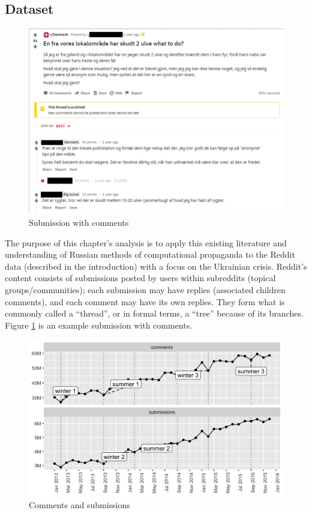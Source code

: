 \subsection{Dataset}

\begin{figure}[!ht]
\centering
\includegraphics[width=\textwidth]{reddit}
\caption{Submission with comments \cite{reddit}}
\label{fig:reddit}
\end{figure}

The purpose of this chapter's analysis is to apply this existing literature and understanding of Russian methods of computational propaganda to the Reddit data (described in the introduction) with a focus on the Ukrainian crisis.
Reddit's content consists of submissions posted by users within subreddits (topical groups/communities); each submission may have replies (associated children comments), and each comment may have its own replies.
They form what is commonly called a ``thread'', or in formal terms, a ``tree'' because of its branches.
Figure \ref{fig:reddit} is an example submission with comments.

\begin{figure}[!ht]
\centering
\includegraphics[width=\textwidth]{rus/count}
\caption{Comments and submissions}
\label{fig:count}
\end{figure}

